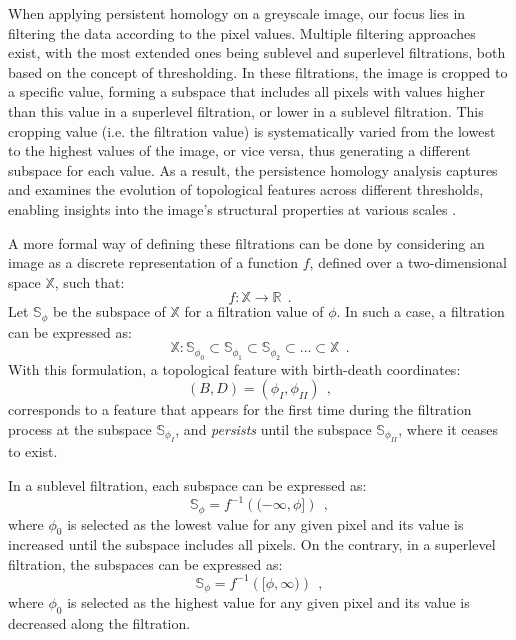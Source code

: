 When applying persistent homology on a greyscale image, our focus lies in filtering the data according to the pixel values. Multiple filtering approaches exist, with the most extended ones being sublevel and superlevel filtrations, both based on the concept of thresholding. In these filtrations, the image is cropped to a specific value, forming a subspace that includes all pixels with values higher than this value in a superlevel filtration, or lower in a sublevel filtration. This cropping value (i.e. the filtration value) is systematically varied from the lowest to the highest values of the image, or vice versa, thus generating a different subspace for each value. As a result, the persistence homology analysis captures and examines the evolution of topological features across different thresholds, enabling insights into the image's structural properties at various scales \citep{ph_image_filtration}.

A more formal way of defining these filtrations can be done by considering an image as a discrete representation of a function $f$, defined over a two-dimensional space $\mathbb{X}$, such that: 
\begin{equation}
    f :  \mathbb{X} \longrightarrow  \mathbb{R} \ \ .
\end{equation}
Let $\mathbb{S} _\phi$ be the subspace of $\mathbb{X}$ for a filtration value of $\phi$. In such a case, a filtration can be expressed as:
\begin{equation}
    \mathbb{X}: \mathbb{S}_{\phi_0} \subset \mathbb{S}_{\phi_1} \subset \mathbb{S}_{\phi_2}\subset... \subset \mathbb{X}\ \ .
\end{equation}
With this formulation, a topological feature with birth-death coordinates:
\begin{equation}
(B, D) = (\phi_ I, \phi _ {II}) \ \ ,
\end{equation} 
corresponds to a feature that appears for the first time during the filtration process at the subspace $\mathbb{S}_{\phi _ I}$, and \textit{persists} until the subspace $\mathbb{S}_{\phi _ {II}}$, where it ceases to exist.

In a sublevel filtration, each subspace can be expressed as:
\begin{equation}
    \mathbb{S} _ \phi = f ^{-1} \left( ( -\infty, \phi ] \right) \ \ ,
    \label{eq: sublevel}
\end{equation}
where $\phi_0$ is selected as the lowest value for any given pixel and its value is increased until the subspace includes all pixels. On the contrary, in a superlevel filtration, the subspaces can be expressed as:
\begin{equation}
    \mathbb{S} _ \phi = f ^{-1} \left( [ \phi, \infty ) \right)\ \ , 
    \label{eq : superlevel}
\end{equation}
where $\phi_0$ is selected as the highest value for any given pixel and its value is decreased along the filtration.

